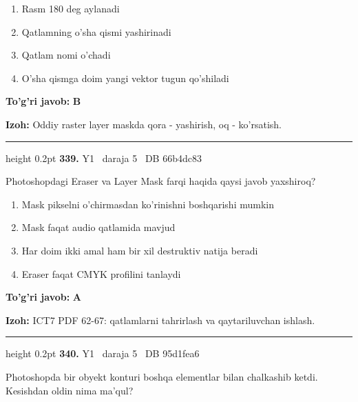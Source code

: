 \documentclass[10pt,a4paper,oneside]{article}
\begin{document}
\begin{enumerate}[label=\Alph*),leftmargin=9mm]
\item Rasm 180 deg  aylanadi
\item Qatlamning o'sha qismi yashirinadi
\item Qatlam nomi o'chadi
\item O'sha qismga doim yangi vektor tugun qo'shiladi
\end{enumerate}
\begin{tcolorbox}[enhanced,breakable,colback=teal!4,colframe=teal!45!black,boxrule=0.45pt,arc=1.2mm,left=2.8mm,right=2.8mm,top=2mm,bottom=2mm,before skip=2mm,after skip=2mm]
\textbf{\color{teal}To'g'ri javob:} \textbf{B}
\par\smallskip
\textbf{Izoh:} Oddiy raster layer maskda qora - yashirish, oq - ko'rsatish.
\end{tcolorbox}
\vspace{2mm}\hrule height 0.2pt \vspace{4mm}
\hypertarget{q339}{\textbf{\color{ink}339.}}  {\color{muted}\scriptsize Y1 \textbullet\ daraja 5 \textbullet\ DB 66b4dc83}
\par
Photoshopdagi Eraser va Layer Mask farqi haqida qaysi javob yaxshiroq?
\begin{enumerate}[label=\Alph*),leftmargin=9mm]
\item Mask pikselni o'chirmasdan ko'rinishni boshqarishi mumkin
\item Mask faqat audio qatlamida mavjud
\item Har doim ikki amal ham bir xil destruktiv natija beradi
\item Eraser faqat CMYK profilini tanlaydi
\end{enumerate}
\begin{tcolorbox}[enhanced,breakable,colback=teal!4,colframe=teal!45!black,boxrule=0.45pt,arc=1.2mm,left=2.8mm,right=2.8mm,top=2mm,bottom=2mm,before skip=2mm,after skip=2mm]
\textbf{\color{teal}To'g'ri javob:} \textbf{A}
\par\smallskip
\textbf{Izoh:} ICT7 PDF 62-67: qatlamlarni tahrirlash va qaytariluvchan ishlash.
\end{tcolorbox}
\vspace{2mm}\hrule height 0.2pt \vspace{4mm}
\hypertarget{q340}{\textbf{\color{ink}340.}}  {\color{muted}\scriptsize Y1 \textbullet\ daraja 5 \textbullet\ DB 95d1fea6}
\par
Photoshopda bir obyekt konturi boshqa elementlar bilan chalkashib ketdi. Kesishdan oldin nima ma'qul?
\end{document}
